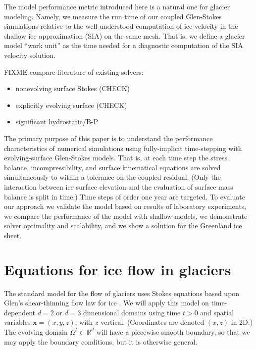 \documentclass[letterpaper,final,12pt,reqno]{amsart}
\newcommand{\RR}{\mathbb{R}}
\newcommand{\bx}{\mathbf{x}}
\begin{document}
The model performance metric introduced here is a natural one for glacier modeling.  Namely, we measure the run time of our coupled Glen-Stokes simulations relative to the well-understood computation of ice velocity in the shallow ice approximation (SIA) \cite{Fowler1997} on the same mesh.  That is, we define a glacier model ``work unit'' as the time needed for a diagnostic computation of the SIA velocity solution.

FIXME compare literature of existing solvers:
\begin{itemize}
\item  nonevolving surface Stokes \cite{IsaacStadlerGhattas2015,Lengetal2013,Lengetal2014a,Zwingeretal2007} (CHECK)
\item  explicitly evolving surface \cite{Gudmundsson1999,HelanowAhlkrona2018,Jouvetetal2008,Larouretal2012,
Lengetal2014b,Lengetal2012,LeysingerGudmundsson2004,PralongFunk2004,Seddiketal2012} (CHECK)
\item significant hydrostatic/B-P \cite{BrownSmithAhmadia2013,Tuminaroetal2016}
\end{itemize}

The primary purpose of this paper is to understand the performance characteristics of numerical simulations using fully-implicit time-stepping with evolving-surface Glen-Stokes models.  That is, at each time step the stress balance, incompressibility, and surface kinematical equations are solved simultaneously to within a tolerance on the coupled residual.  (Only the interaction between ice surface elevation and the evaluation of surface mass balance is split in time.)  Time steps of order one year are targeted.  To evaluate our approach we validate the model based on results of laboratory experiments, we compare the performance of the model with shallow models, we demonstrate solver optimality and scalability, and we show a solution for the Greenland ice sheet.


\section{Equations for ice flow in glaciers} \label{sec:strongform}

The standard model for the flow of glaciers uses Stokes equations based upon Glen's shear-thinning flow law for ice \cite{GreveBlatter2009,JouvetRappaz2011,SchoofHewitt2013}.  We will apply this model on time-dependent $d=2$ or $d=3$ dimensional domains using time $t>0$ and spatial variables $\bx=(x,y,z)$, with $z$ vertical.  (Coordinates are denoted $(x,z)$ in 2D.)  The evolving domain $\Omega^t \subset \RR^d$ will have a piecewise smooth boundary, so that we may apply the boundary conditions, but it is otherwise general.
\end{document}

